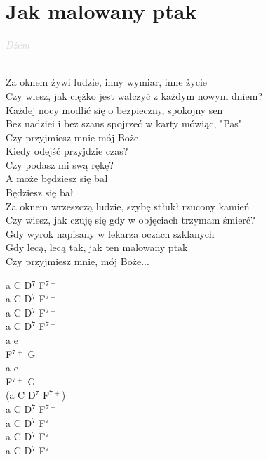 \documentclass[a5paper, 10pt]{book}
\begin{document}
\section{Jak malowany ptak}\textcolor{lightgray}{\textit{Dżem}}\\~\\
\begin{minipage}[t]{0.8\textwidth}
  Za oknem żywi ludzie, inny wymiar, inne życie\\
  Czy wiesz, jak ciężko jest walczyć z każdym nowym dniem?\\
  Każdej nocy modlić się o bezpieczny, spokojny sen\\
  Bez nadziei i bez szans spojrzeć w karty mówiąc, "Pas"\\

  \hspace*{5mm}Czy przyjmiesz mnie mój Boże\\
  \hspace*{5mm}Kiedy odejść przyjdzie czas?\\
  \hspace*{5mm}Czy podasz mi swą rękę?\\
  \hspace*{5mm}A może będziesz się bał\\
  \hspace*{5mm}Będziesz się bał\\

  Za oknem wrzeszczą ludzie, szybę stłukł rzucony kamień\\
  Czy wiesz, jak czuję się gdy w objęciach trzymam śmierć?\\
  Gdy wyrok napisany w lekarza oczach szklanych\\
  Gdy lecą, lecą tak, jak ten malowany ptak\\

  Czy przyjmiesz mnie, mój Boże...\\

\end{minipage}
\begin{minipage}[t]{0.2\textwidth}
  a C D$^7$ F$^{7+}$\\
  a C D$^7$ F$^{7+}$\\
  a C D$^7$ F$^{7+}$\\
  a C D$^7$ F$^{7+}$\\

  a e\\
  F$^{7+}$ G\\
  a e\\
  F$^{7+}$ G\\
  (a C D$^7$ F$^{7+}$)\\

  a C D$^7$ F$^{7+}$\\
  a C D$^7$ F$^{7+}$\\
  a C D$^7$ F$^{7+}$\\
  a C D$^7$ F$^{7+}$\\
\end{minipage}
\end{document}
